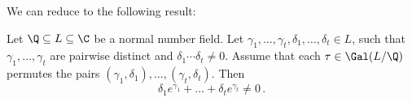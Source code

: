 We can reduce  to the following result:

\begin{thmn} 
	Let \( \Q \subseteq L \subseteq \C \) be a normal number field.
	Let \( \gamma_1, \dotsc, \gamma_t, \delta_1, \dotsc, \delta_t \in L \), such that \( \gamma_1, \dotsc, \gamma_t \) are pairwise distinct and \( \delta_1 \dotsm \delta_t \neq 0 \).
	Assume that each \( \tau \in \Gal(L/\Q) \) permutes the pairs \( (\gamma_1, \delta_1), \dotsc, (\gamma_t, \delta_t) \).
	Then
	\[ \delta_1 e^{\gamma_1} + \dots + \delta_t e^{\gamma_t} \neq 0 \,. \]
\end{thmn}